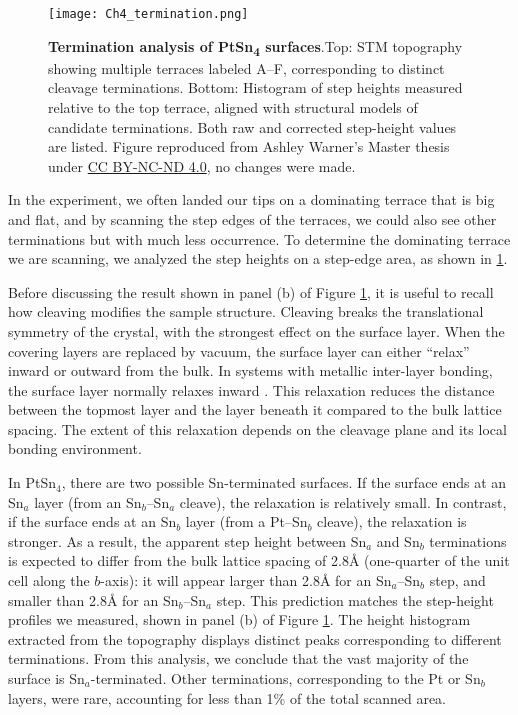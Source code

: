 \begin{figure}
	\centering
	\texttt{[image: Ch4\_termination.png]}
	\caption[\textbf{Termination analysis of PtSn\textsubscript{4} surfaces}]{\textbf{Termination analysis of PtSn\textsubscript{4} surfaces}.Top: STM topography showing multiple terraces labeled A–F, corresponding to distinct cleavage terminations.
	Bottom: Histogram of step heights measured relative to the top terrace, aligned with structural models of candidate terminations. Both raw and corrected step-height values are listed. Figure reproduced from Ashley Warner's Master thesis~\cite{warnerDefectTerraceCharacterization2022} under
	\href{https://creativecommons.org/licenses/by-nc-nd/4.0/}{CC BY-NC-ND 4.0}, no changes were made. }
	\label{fig:ch4_termination}
\end{figure}

\par In the experiment, we often landed our tips on a dominating terrace that is big and flat, and by scanning the step edges of the terraces, we could also see other terminations but with much less occurrence. To determine the dominating terrace we are scanning, we analyzed the step heights on a step-edge area, as shown in \ref{fig:ch4_termination}. 

Before discussing the result shown in panel (b) of Figure \ref{fig:ch4_termination}, it is useful to recall how cleaving modifies the sample structure. Cleaving breaks the translational symmetry of the crystal, with the strongest effect on the surface layer. When the covering layers are replaced by vacuum, the surface layer can either “relax” inward or outward from the bulk. In systems with metallic inter-layer bonding, the surface layer normally relaxes inward \cite{okazawaEnhancedCorrelatedThermal2005}. This relaxation reduces the distance between the topmost layer and the layer beneath it compared to the bulk lattice spacing. The extent of this relaxation depends on the cleavage plane and its local bonding environment.

In PtSn$_4$, there are two possible Sn-terminated surfaces. If the surface ends at an Sn$_a$ layer (from an Sn$_b$–Sn$_a$ cleave), the relaxation is relatively small. In contrast, if the surface ends at an Sn$_b$ layer (from a Pt–Sn$_b$ cleave), the relaxation is stronger. As a result, the apparent step height between Sn$_a$ and Sn$_b$ terminations is expected to differ from the bulk lattice spacing of 2.8{\AA} (one-quarter of the unit cell along the $b$-axis): it will appear larger than 2.8{\AA} for an Sn$_a$–Sn$_b$ step, and smaller than 2.8{\AA} for an Sn$_b$–Sn$_a$ step. This prediction matches the step-height profiles we measured, shown in panel (b) of Figure \ref{fig:ch4_termination}. The height histogram extracted from the topography displays distinct peaks corresponding to different terminations. From this analysis, we conclude that the vast majority of the surface is Sn$_a$-terminated. Other terminations, corresponding to the Pt or Sn$_b$ layers, were rare, accounting for less than 1\% of the total scanned area.


